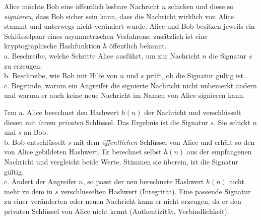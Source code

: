 \question[5]
Alice möchte Bob eine öffentlich lesbare Nachricht $n$ schicken und diese so \textit{signieren},
dass Bob sicher sein kann, dass die Nachricht wirklich von Alice stammt und unterwegs nicht
verändert wurde. Alice und Bob besitzen jeweils ein Schlüsselpaar eines asymmetrischen Verfahrens; zusätzlich ist eine
kryptographische Hashfunktion $h$ öffentlich bekannt. \\
a. Beschreibe, welche Schritte Alice ausführt, um zur Nachricht $n$ die Signatur $s$ zu erzeugen. \\
b. Beschreibe, wie Bob mit Hilfe von $n$ und $s$ prüft, ob die Signatur gültig ist. \\
c. Begründe, warum ein Angreifer die signierte Nachricht nicht unbemerkt ändern und warum
er auch keine neue Nachricht im Namen von Alice signieren kann.

\begin{solutionbox}{7cm}
a. Alice berechnet den Hashwert $h(n)$ der Nachricht und verschlüsselt diesen mit ihrem
\textit{privaten} Schlüssel. Das Ergebnis ist die Signatur $s$. Sie schickt $n$ und $s$ an Bob. \\
b. Bob entschlüsselt $s$ mit dem \textit{öffentlichen} Schlüssel von Alice und erhält so den
von Alice gebildeten Hashwert. Er berechnet selbst $h(n)$ aus der empfangenen Nachricht und
vergleicht beide Werte. Stimmen sie überein, ist die Signatur gültig. \\
c. Ändert der Angreifer $n$, so passt der neu berechnete Hashwert $h(n)$ nicht mehr zu dem in
$s$ verschlüsselten Hashwert (Integrität). Eine passende Signatur zu einer veränderten oder
neuen Nachricht kann er nicht erzeugen, da er den privaten Schlüssel von Alice nicht kennt
(Authentizität, Verbindlichkeit).
\end{solutionbox}
